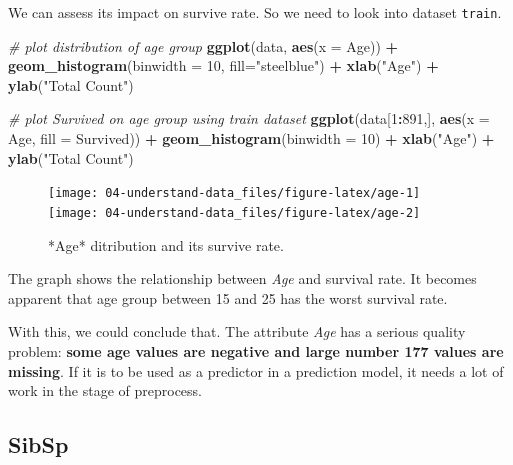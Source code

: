 \documentclass[
]{book}
\newenvironment{Shaded}{\begin{snugshade}}{\end{snugshade}}
\newcommand{\CommentTok}[1]{\textcolor[rgb]{0.56,0.35,0.01}{\textit{#1}}}
\newcommand{\DataTypeTok}[1]{\textcolor[rgb]{0.13,0.29,0.53}{#1}}
\newcommand{\DecValTok}[1]{\textcolor[rgb]{0.00,0.00,0.81}{#1}}
\newcommand{\KeywordTok}[1]{\textcolor[rgb]{0.13,0.29,0.53}{\textbf{#1}}}
\newcommand{\NormalTok}[1]{#1}
\newcommand{\OperatorTok}[1]{\textcolor[rgb]{0.81,0.36,0.00}{\textbf{#1}}}
\newcommand{\StringTok}[1]{\textcolor[rgb]{0.31,0.60,0.02}{#1}}
\begin{document}
We can assess its impact on survive rate. So we need to look into dataset \texttt{train}.

\begin{Shaded}
\begin{Highlighting}[]
\CommentTok{# plot distribution of age group}
\KeywordTok{ggplot}\NormalTok{(data, }\KeywordTok{aes}\NormalTok{(}\DataTypeTok{x =}\NormalTok{ Age)) }\OperatorTok{+}
\StringTok{  }\KeywordTok{geom_histogram}\NormalTok{(}\DataTypeTok{binwidth =} \DecValTok{10}\NormalTok{, }\DataTypeTok{fill=}\StringTok{"steelblue"}\NormalTok{) }\OperatorTok{+}
\StringTok{  }\KeywordTok{xlab}\NormalTok{(}\StringTok{"Age"}\NormalTok{) }\OperatorTok{+}
\StringTok{  }\KeywordTok{ylab}\NormalTok{(}\StringTok{"Total Count"}\NormalTok{)}

\CommentTok{# plot Survived on age group using train dataset}
\KeywordTok{ggplot}\NormalTok{(data[}\DecValTok{1}\OperatorTok{:}\DecValTok{891}\NormalTok{,], }\KeywordTok{aes}\NormalTok{(}\DataTypeTok{x =}\NormalTok{ Age, }\DataTypeTok{fill =}\NormalTok{ Survived)) }\OperatorTok{+}
\StringTok{  }\KeywordTok{geom_histogram}\NormalTok{(}\DataTypeTok{binwidth =} \DecValTok{10}\NormalTok{) }\OperatorTok{+}
\StringTok{  }\KeywordTok{xlab}\NormalTok{(}\StringTok{"Age"}\NormalTok{) }\OperatorTok{+}
\StringTok{  }\KeywordTok{ylab}\NormalTok{(}\StringTok{"Total Count"}\NormalTok{)}
\end{Highlighting}
\end{Shaded}

\begin{figure}

{\centering \texttt{[image: 04-understand-data\_files/figure-latex/age-1]} \texttt{[image: 04-understand-data\_files/figure-latex/age-2]} 

}

\caption{*Age* ditribution and its survive rate.}\label{fig:age}
\end{figure}

The graph shows the relationship between \emph{Age} and survival rate. It becomes apparent that age group between 15 and 25 has the worst survival rate.

With this, we could conclude that. The attribute \emph{Age} has a serious quality problem: \textbf{some age values are negative and large number 177 values are missing}. If it is to be used as a predictor in a prediction model, it needs a lot of work in the stage of preprocess.

\hypertarget{sibsp}{%
\subsection*{SibSp}\label{sibsp}}
\end{document}
